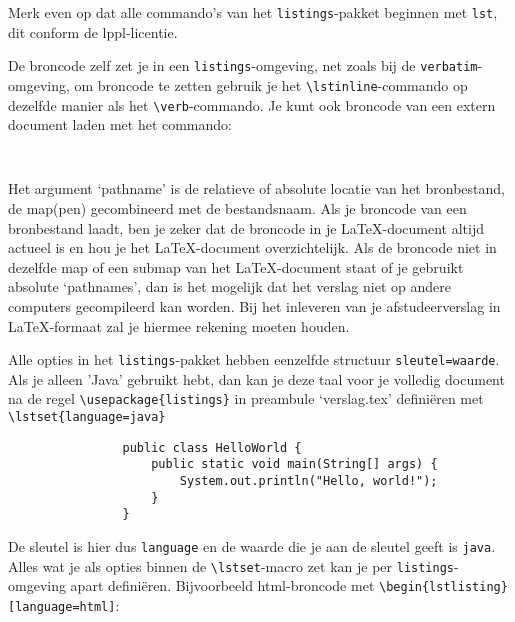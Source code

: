 		Merk even op dat alle commando's van het \verb!listings!-pakket
		beginnen met \verb!lst!, dit conform de lppl-licentie.
		
		De broncode zelf zet je in een \verb!listings!-omgeving, net zoals bij
		de \verb!verbatim!-omgeving, om broncode te zetten gebruik je het
		\verb!\lstinline!-commando op dezelfde manier als het
		\verb!\verb!-commando. Je kunt ook broncode van een extern document laden met het commando:
		
		\begin{Aanpassen}
			\begin{verbatim}
				
			\end{verbatim}
		\end{Aanpassen}
		
		Het argument `pathname' is de relatieve of absolute locatie van het
		bronbestand, de map(pen) gecombineerd met de bestandsnaam. Als je
		broncode van een bronbestand laadt, ben je zeker dat de broncode in je
		\LaTeX{}-document altijd actueel is en hou je het \LaTeX{}-document
		overzichtelijk. Als de broncode niet in dezelfde map of een submap van
		het \LaTeX{}-document staat of je gebruikt absolute `pathnames', dan
		is het mogelijk dat het verslag niet op andere computers gecompileerd
		kan worden. Bij het inleveren van je afstudeerverslag in
		\LaTeX{}-formaat zal je hiermee rekening moeten houden.
		
		
		Alle opties in het \verb!listings!-pakket hebben eenzelfde structuur
		\verb!sleutel=waarde!. Als je alleen 'Java' gebruikt hebt, dan kan je
		deze taal voor je volledig document na de regel
		\verb!\usepackage{listings}! in preambule `verslag.tex' definiëren met
		\verb!\lstset{language=java}!
		
		\lstset{language=java}
		
		\begin{Aanpassen}
			\begin{lstlisting}
				public class HelloWorld {
					public static void main(String[] args) {
						System.out.println("Hello, world!");
					}
				}
			\end{lstlisting}
		\end{Aanpassen}
		
		
		De sleutel is hier dus \verb!language! en de waarde die je aan de
		sleutel geeft is \verb!java!. Alles wat je als opties binnen de
		\verb!\lstset!-macro zet kan je per \verb!listings!-omgeving apart
		definiëren. Bijvoorbeeld html-broncode met
		\verb!\begin{lstlisting}[language=html]!:
			
